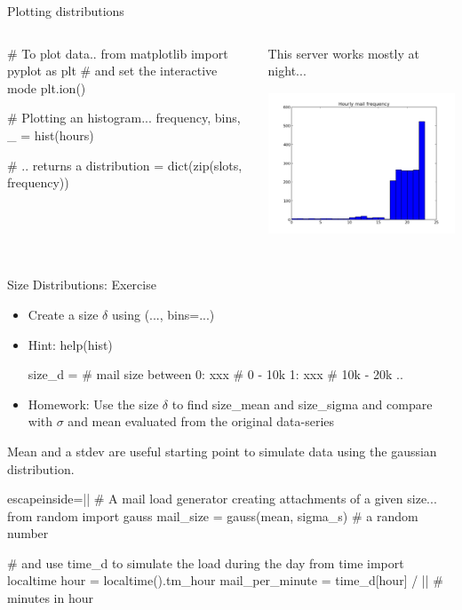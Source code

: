 \begin{pyframe}{Plotting distributions}
\begin{columns}
\begin{pycode}
# To plot data..
from matplotlib import pyplot as plt
# and set the interactive mode
plt.ion()

# Plotting an histogram... 
frequency, bins, _ = hist(hours)

# .. returns a 
distribution = dict(zip(slots, 
    frequency))
\end{pycode}
This server works mostly at night...
\includegraphics[width=6cm,height=5cm]{hourly_mail_d.pdf}
\end{columns}
\end{pyframe}

\begin{pyframe}{Size Distributions: Exercise}
\begin{itemize}
\item Create a size $\delta$ using (..., bins=...)
\item Hint: help(hist)
\begin{pycode}
size_d = {  # mail size between
    0: xxx  #  0 - 10k
    1: xxx  #  10k - 20k
    ..
    }
\end{pycode}
\item Homework: Use the size $\delta$ to find size\_mean and size\_sigma and compare with $\sigma$ and mean evaluated from the original data-series
\end{itemize}
\end{pyframe}



\begin{pyframe}{}
Mean and a stdev are useful starting point to simulate data using the gaussian distribution.
\begin{pycode*}{escapeinside=||}
# A mail load generator creating attachments of a given size...
from random import gauss
mail_size = gauss(mean, sigma_s) # a random number

# and use time_d to simulate the load during the day
from time import localtime
hour = localtime().tm_hour
mail_per_minute = time_d[hour] / || # minutes in hour
\end{pycode*}
\end{pyframe}



